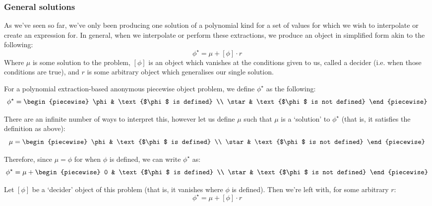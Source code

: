 \subsubsection{General solutions}
\label{section:polynomial_general}
As we've seen so far, we've only been producing one solution of a polynomial kind for a set of values for which we wish to interpolate or create an expression for. In general, when we interpolate or perform these extractions, we produce an object in simplified form akin to the following:
$$
    \phi^\star = \mu + [\phi]\cdot r
$$
Where $\mu$ is some solution to the problem, $[\phi]$ is an object which vanishes at the conditions given to us, called a decider (i.e. when those conditions are true), and $r$ is some arbitrary object which generalises our single solution.

\begin{theorem}
    For a polynomial extraction-based anonymous piecewise object problem, we define $\phi^\star$ as the following:
    $$
        \phi^\star = \begin{piecewise}
            \phi & \text{$\phi$ is defined} \\
            \star & \text{$\phi$ is not defined}
        \end{piecewise}
    $$

    There are an infinite number of ways to interpret this, however let us define $\mu$ such that $\mu$ is a `solution' to $\phi^\star$ (that is, it satisfies the definition as above):
    $$
        \mu = \begin{piecewise}
            \phi & \text{$\phi$ is defined} \\
            \star & \text{$\phi$ is not defined}
        \end{piecewise}
    $$

    Therefore, since $\mu=\phi$ for when $\phi$ is defined, we can write $\phi^\star$ as:
    $$
        \phi^\star = \mu + \begin{piecewise}
            0 & \text{$\phi$ is defined} \\
            \star & \text{$\phi$ is not defined}
        \end{piecewise}
    $$

    Let $[\phi]$ be a `decider' object of this problem (that is, it vanishes where $\phi$ is defined). Then we're left with, for some arbitrary $r$:
    $$
        \phi^\star = \mu + [\phi]\cdot r
    $$
\end{theorem}

